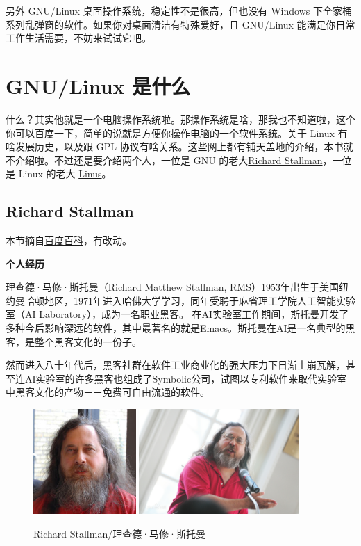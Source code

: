 \documentclass[doctor,openright,twoside]{sjtuthesis}
\theoremstyle{plain}
\theoremstyle{definition}
\theoremstyle{remark}
\theoremstyle{ocrenumbox}
\theoremstyle{plain}
\begin{document}
另外 GNU/Linux 桌面操作系统，稳定性不是很高，但也没有 Windows
下全家桶系列乱弹窗的软件。如果你对桌面清洁有特殊爱好，且 GNU/Linux
能满足你日常工作生活需要，不妨来试试它吧。

\hypertarget{gnulinux-}{%
\section{GNU/Linux 是什么}\label{gnulinux-}}

什么？其实他就是一个电脑操作系统啦。那操作系统是啥，那我也不知道啦，这个你可以百度一下，简单的说就是方便你操作电脑的一个软件系统。关于
Linux 有啥发展历史，以及跟 GPL
协议有啥关系。这些网上都有铺天盖地的介绍，本书就不介绍啦。不过还是要介绍两个人，一位是
GNU 的老大\href{http://www.stallman.org/}{Richard Stallman}，一位是
Linux 的老大
\href{https://en.wikipedia.org/wiki/Linus_Torvalds}{Linus}。

\hypertarget{richard-stallman}{%
\subsection{Richard Stallman}\label{richard-stallman}}

本节摘自\href{https://baike.baidu.com/item/\%E7\%90\%86\%E6\%9F\%A5\%E5\%BE\%B7\%C2\%B7\%E9\%A9\%AC\%E4\%BF\%AE\%C2\%B7\%E6\%96\%AF\%E6\%89\%98\%E6\%9B\%BC?fromtitle=Richard+Stallman\&fromid=9336362}{百度百科}，有改动。

\textbf{个人经历}

理查德·马修·斯托曼（Richard Matthew Stallman,
RMS）1953年出生于美国纽约曼哈顿地区，1971年进入哈佛大学学习，同年受聘于麻省理工学院人工智能实验室（AI
Laboratory），成为一名职业黑客。
在AI实验室工作期间，斯托曼开发了多种今后影响深远的软件，其中最著名的就是Emacs。斯托曼在AI是一名典型的黑客，是整个黑客文化的一份子。

然而进入八十年代后，黑客社群在软件工业商业化的强大压力下日渐土崩瓦解，甚至连AI实验室的许多黑客也组成了Symbolic公司，试图以专利软件来取代实验室中黑客文化的产物－－免费可自由流通的软件。

\begin{figure}[!htp]
  \centering
  \includegraphics[height=4cm]{images/richardstallman.jpg}
  \hspace{1cm}
  \includegraphics[height=4cm]{images/richardstallman.png}
  \label{fig:rms}
  \caption{Richard Stallman/理查德·马修·斯托曼}
\end{figure}
\end{document}
